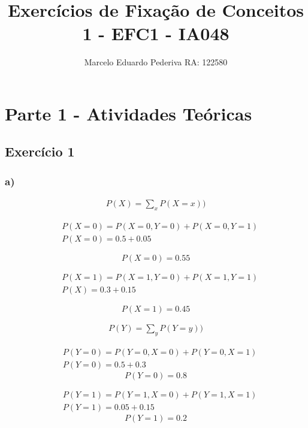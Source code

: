 \documentclass[12pt]{article}
\title{Exercícios de Fixação de Conceitos 1 - EFC1 - IA048}
\author{Marcelo Eduardo Pederiva RA: 122580}
\date{}
\begin{document}
\maketitle
\section*{Parte 1 - Atividades Teóricas}

\subsection*{Exercício 1}
\subsubsection*{a)}


\begin{align*}
	P(X) = \sum_xP(X=x))
\end{align*}

\begin{align*}\
	&P(X=0) = P(X=0,Y=0)+P(X=0,Y=1)\\
	&P(X=0) = 0.5+0.05
\end{align*}

\begin{equation*}
	\boxed{P(X=0) = 0.55}
\end{equation*}

\begin{align*}\
	&P(X=1) = P(X=1,Y=0)+P(X=1,Y=1)\\
	&P(X) = 0.3+0.15
\end{align*}

\begin{equation*}
\boxed{P(X=1) = 0.45}
\end{equation*}

\begin{align*}
P(Y) = \sum_yP(Y=y))
\end{align*}

\begin{align*}\
	&P(Y=0) = P(Y=0,X=0)+P(Y=0,X=1)\\
	&P(Y=0) = 0.5+0.3
\end{align*}
\begin{equation*}
\boxed{P(Y=0) = 0.8}
\end{equation*}


\begin{align*}\
	&P(Y=1) = P(Y=1,X=0)+P(Y=1,X=1)\\
	&P(Y=1) = 0.05+0.15
\end{align*}
\begin{equation*}
\boxed{P(Y=1) = 0.2}
\end{equation*}
\end{document}
